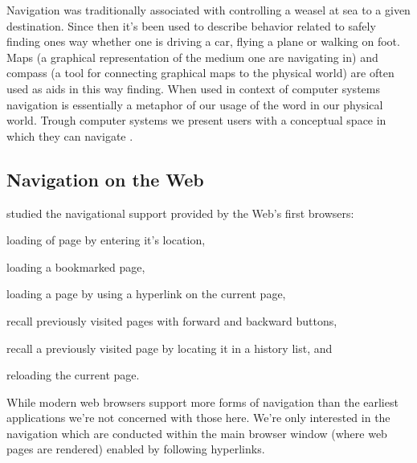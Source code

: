 Navigation was traditionally associated with controlling a weasel at sea to
a given destination.%
Since then it's been used to describe behavior related to safely finding ones
way whether one is driving a car, flying a plane or walking on foot. Maps
(a graphical representation of the medium one are navigating in)
and compass (a tool for connecting graphical maps to the physical world)
are often used as aids in this way finding. When used in context of
computer systems navigation is essentially a metaphor of our usage of the
word in our physical world. Trough computer systems we present users with a
conceptual space in which they can navigate \citep[p.~189]{whiteside85}.

\subsection{Navigation on the Web}

\citet{jones96} studied the navigational support provided by the Web's first
browsers:
\begin{inparaenum}[(i)]
  \item loading of page by entering it's location,
  \item loading a bookmarked page,
  \item loading a page by using a hyperlink on the current page,
  \item recall previously visited pages with forward and backward buttons,
  \item recall a previously visited page by locating it in a history list, and
  \item reloading the current page.
\end{inparaenum}
While modern web browsers support more forms of navigation%
than the earliest applications we're not concerned with those here.
We're only interested in the navigation which are conducted within the main
browser window (where web pages are rendered) enabled by following hyperlinks.

